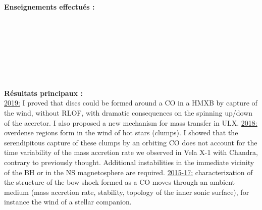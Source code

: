 \documentclass[11pt]{article}
\begin{document}
\vspace{-0.1cm}

{\bf Enseignements effectu\'es :}\\
    \\
    \\
    \\
    \\ 
    \\ 
    \\ 
   \\ 

\vspace{-0.1cm}

{\bf R\'esultats principaux :} \\
\underline{2019:} I proved that discs could be formed around a CO in a HMXB by capture of the wind, without RLOF, with dramatic consequences on the spinning up/down of the accretor. I also proposed a new mechanism for mass transfer in ULX. \underline{2018:} overdense regions form in the wind of hot stars (clumps). I showed that the serendipitous capture of these clumps by an orbiting CO does not account for the time variability of the mass accretion rate we observed in Vela X-1 with Chandra, contrary to previously thought. Additional instabilities in the immediate vicinity of the BH or in the NS magnetosphere are required. \underline{2015-17:} characterization of the structure of the bow shock formed as a CO moves through an ambient medium (mass accretion rate, stability, topology of the inner sonic surface), for instance the wind of a stellar companion.\\
\end{document}
